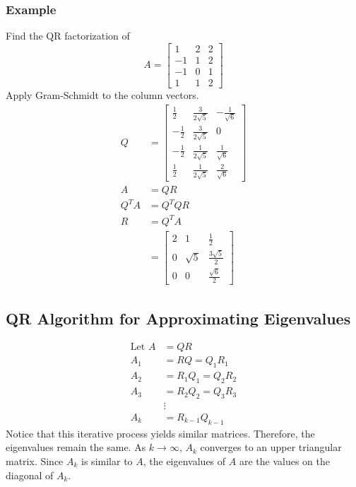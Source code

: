 \documentclass{math}
\begin{document}
\subsubsection*{Example}
Find the QR factorization of
\[ A = \begin{bmatrix}
  1 & 2 & 2 \\
  -1 & 1 & 2 \\
  -1 & 0 & 1 \\
  1 & 1 & 2
\end{bmatrix} \]
Apply Gram-Schmidt to the column vectors.
\begin{align*}
  Q &= \begin{bmatrix}
    \frac{1}{2} & \frac{3}{2\sqrt{5}} & -\frac{1}{\sqrt{6}} \\
    -\frac{1}{2} & \frac{3}{2\sqrt{5}} & 0 \\
    -\frac{1}{2} & \frac{1}{2\sqrt{5}} & \frac{1}{\sqrt{6}} \\
    \frac{1}{2} & \frac{1}{2\sqrt{5}} & \frac{2}{\sqrt{6}}
  \end{bmatrix} \\
  A &= QR \\
  Q^TA &= Q^TQR \\
  R &= Q^TA \\
  &= \begin{bmatrix}
    2 & 1 & \frac{1}{2} \\
    0 & \sqrt{5} & \frac{3\sqrt{5}}{2} \\
    0 & 0 & \frac{\sqrt{6}}{2}
  \end{bmatrix}
\end{align*}

\subsection*{QR Algorithm for Approximating Eigenvalues}
\begin{align*}
  \text{Let } A &= QR \\
  A_1 &= RQ = Q_1R_1 \\
  A_2 &= R_1Q_1 = Q_2R_2 \\
  A_3 &= R_2Q_2 = Q_3R_3 \\
  &\vdots \\
  A_k &= R_{k-1}Q_{k-1}
\end{align*}
Notice that this iterative process yields similar matrices. Therefore, the
eigenvalues remain the same. As \( k\to\infty \), \( A_k \) converges to an
upper triangular matrix. Since \( A_k \) is similar to \( A \), the eigenvalues
of \( A \) are the values on the diagonal of \( A_k \).
\end{document}
